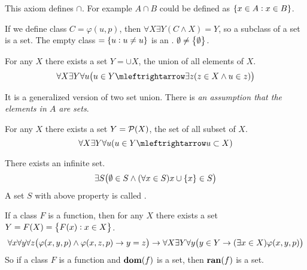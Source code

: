This axiom defines $\cap$. For example $A \cap B$ could be defined as $\set{x \in A: x \in B}$.


If we define class $C = \varphi(u, p)$, then $\forall X \exists Y (C \wedge X )= Y$, so a subclass of a set is a set. The empty class \cindex{$\emptyset$} $ = \set{u: u \neq u} $ is an . $\emptyset \neq \set{\emptyset}$.

\begin{axiom}
    For any $X$ there exists a set $Y = \cup X$, the union of all elements of $X$.
    \begin{equation}
        \forall X \exists Y \forall u \mleft(u \in Y \mleftrightarrow \exists z (z \in X \wedge u \in z ) \mright)
    \end{equation}
    
    It is a generalized version of two set union. There is \emph{an assumption that the elements in $A$ are sets}.
\end{axiom}

\begin{axiom}
    For any $X$ there exists a set $Y = \powerset{X}$, the set of all subset of $X$.
    \begin{equation}
        \forall X \exists Y \forall u (u \in Y \mleftrightarrow u \subset X )
    \end{equation}
\end{axiom}

\begin{axiom}
    There exists an infinite set.
    \begin{equation}
        \exists S \mleft( \emptyset \in S \wedge (\forall x \in S ) x \cup \set{x} \in S \mright)
    \end{equation}
    A set $S$ with above property is called .
\end{axiom}

\begin{axiom}
    If a class $F$ is a function, then for any $X$ there exists a set $Y = F(X) = \set{F(x): x \in X}$.
    \begin{equation}
        \forall x \forall y \forall z \mleft( \varphi(x,y,p) \wedge \varphi(x,z,p) \rightarrow y = z \mright) \rightarrow \forall X \exists Y \forall y \mleft( y \in Y \rightarrow (\exists x \in X ) \varphi(x,y,p) \mright)
    \end{equation}
    So if a class $F$ is a function and $\mathbf{dom}(f)$ is a set, then $\mathbf{ran}(f)$ is a set.
\end{axiom}

